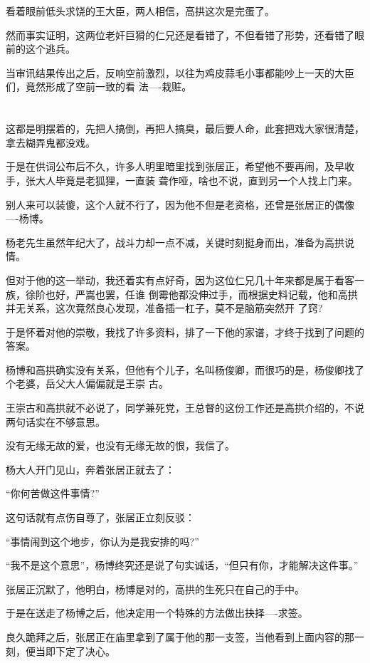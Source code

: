 \documentclass[11pt,a4paper,onecolumn]{article}
\begin{document}
看着眼前低头求饶的王大臣，两人相信，高拱这次是完蛋了。

然而事实证明，这两位老奸巨猾的仁兄还是看错了，不但看错了形势，还看错了眼前的这个逃兵。

当审讯结果传出之后，反响空前激烈，以往为鸡皮蒜毛小事都能吵上一天的大臣们，竟然形成了空前一致的看
法----栽赃。

\section[\thesection]{}

这都是明摆着的，先把人搞倒，再把人搞臭，最后要人命，此套把戏大家很清楚，拿去糊弄鬼都没戏。

于是在供词公布后不久，许多人明里暗里找到张居正，希望他不要再闹，及早收手，张大人毕竟是老狐狸，一直装
聋作哑，啥也不说，直到另一个人找上门来。

别人来可以装傻，这个人就不行了，因为他不但是老资格，还曾是张居正的偶像----杨博。

杨老先生虽然年纪大了，战斗力却一点不减，关键时刻挺身而出，准备为高拱说情。

但对于他的这一举动，我还着实有点好奇，因为这位仁兄几十年来都是属于看客一族，徐阶也好，严嵩也罢，任谁
倒霉他都没伸过手，而根据史料记载，他和高拱并无关系，这次竟然良心发现，准备插一杠子，莫不是脑筋突然开
了窍?

于是怀着对他的崇敬，我找了许多资料，排了一下他的家谱，才终于找到了问题的答案。

杨博和高拱确实没有关系，但他有个儿子，名叫杨俊卿，而很巧的是，杨俊卿找了个老婆，岳父大人偏偏就是王崇
古。

王崇古和高拱就不必说了，同学兼死党，王总督的这份工作还是高拱介绍的，不说两句话实在不够意思。

没有无缘无故的爱，也没有无缘无故的恨，我信了。

杨大人开门见山，奔着张居正就去了：

``你何苦做这件事情?''

这句话就有点伤自尊了，张居正立刻反驳：

``事情闹到这个地步，你认为是我安排的吗?''

``我不是这个意思''，杨博终究还是说了句实诚话，``但只有你，才能解决这件事。''

张居正沉默了，他明白，杨博是对的，高拱的生死只在自己的手中。

于是在送走了杨博之后，他决定用一个特殊的方法做出抉择----求签。

良久跪拜之后，张居正在庙里拿到了属于他的那一支签，当他看到上面内容的那一刻，便当即下定了决心。
\end{document}
